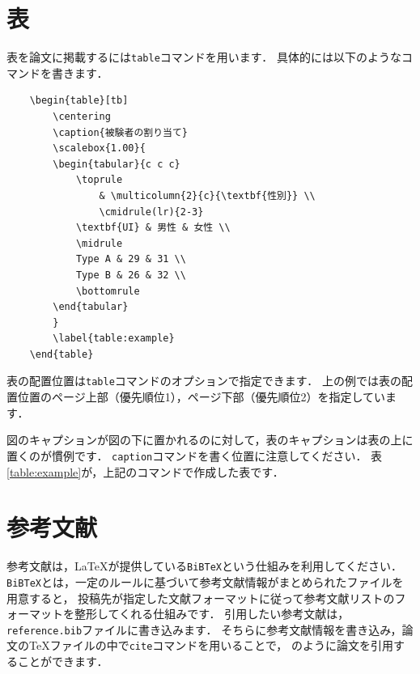 \documentclass{simplepaper}
\begin{document}
\section{表}
表を論文に掲載するには\texttt{table}コマンドを用います．
具体的には以下のようなコマンドを書きます．

\begin{verbatim}
    \begin{table}[tb]
        \centering
        \caption{被験者の割り当て}
        \scalebox{1.00}{
        \begin{tabular}{c c c}
            \toprule
                & \multicolumn{2}{c}{\textbf{性別}} \\
                \cmidrule(lr){2-3}
            \textbf{UI} & 男性 & 女性 \\
            \midrule
            Type A & 29 & 31 \\
            Type B & 26 & 32 \\
            \bottomrule
        \end{tabular}
        }
        \label{table:example}
    \end{table}
\end{verbatim}
表の配置位置は\texttt{table}コマンドのオプションで指定できます．
上の例では表の配置位置のページ上部（優先順位1），ページ下部（優先順位2）を指定しています．

図のキャプションが図の下に置かれるのに対して，表のキャプションは表の上に置くのが慣例です．
\texttt{caption}コマンドを書く位置に注意してください．
表\ref{table:example}が，上記のコマンドで作成した表です．

\begin{table}[tb]
    \centering
    \caption{被験者の割り当て}
    \label{table:example}
\end{table}


\section{参考文献}
参考文献は，LaTeXが提供している\texttt{BiBTeX}という仕組みを利用してください．
\texttt{BiBTeX}とは，一定のルールに基づいて参考文献情報がまとめられたファイルを用意すると，
投稿先が指定した文献フォーマットに従って参考文献リストのフォーマットを整形してくれる仕組みです．
引用したい参考文献は，\texttt{reference.bib}ファイルに書き込みます．
そちらに参考文献情報を書き込み，論文のTeXファイルの中で\texttt{cite}コマンドを用いることで，
\cite{WebSci2018}\cite{Yamamoto2020}のように論文を引用することができます．
\end{document}
